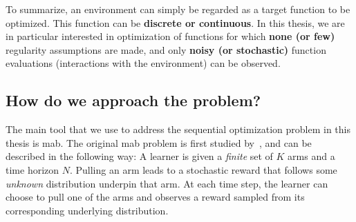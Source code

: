 To summarize, an environment can simply be regarded as a target function to be optimized. This function can be \textbf{discrete or continuous}. In this thesis, we are in particular interested in optimization of functions for which \textbf{none (or few)} regularity assumptions are made, and only \textbf{noisy (or stochastic)} function evaluations (interactions with the environment) can be observed.



\subsection{How do we approach the problem?}\label{sec:intro.context.how}

The main tool that we use to address the sequential optimization problem in this thesis is \gls{mab}. The original \gls{mab} problem is first studied by~\cite{thompson1933}, and can be described in the following way: A learner is given a \emph{finite} set of $K$ arms and a time horizon $N$. Pulling an arm leads to a stochastic reward that follows some \emph{unknown} distribution underpin that arm. At each time step, the learner can choose to pull one of the arms and observes a reward sampled from its corresponding underlying distribution.

